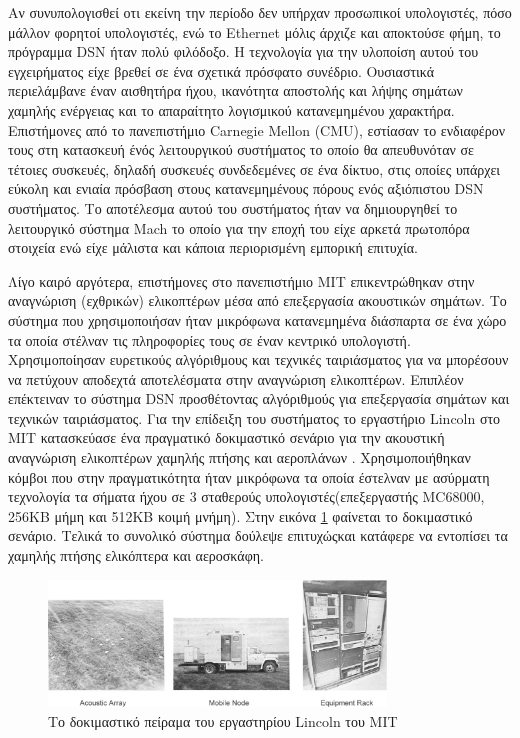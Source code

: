 Αν συνυπολογισθεί οτι εκείνη την περίοδο δεν υπήρχαν προσωπικοί υπολογιστές, πόσο μάλλον φορητοί υπολογιστές, ενώ το Ethernet μόλις άρχιζε και αποκτούσε φήμη, το
πρόγραμμα DSN ήταν πολύ φιλόδοξο.
Η τεχνολογία για την υλοποίση αυτού του εγχειρήματος είχε βρεθεί σε ένα σχετικά πρόσφατο συνέδριο\cite{1978DSN}.
Ουσιαστικά περιελάμβανε έναν αισθητήρα ήχου, ικανότητα αποστολής και λήψης σημάτων χαμηλής ενέργειας και το απαραίτητο λογισμικού κατανεμημένου χαρακτήρα.
Επιστήμονες από το πανεπιστήμιο Carnegie Mellon (CMU), εστίασαν το ενδιαφέρον τους στη κατασκευή ένός λειτουργικού συστήματος το οποίο θα απευθυνόταν σε τέτοιες
συσκευές, δηλαδή συσκευές συνδεδεμένες σε ένα δίκτυο, στις οποίες υπάρχει εύκολη και ενιαία πρόσβαση στους κατανεμημένους πόρους ενός αξιόπιστου DSN συστήματος.
Το αποτέλεσμα αυτού του συστήματος ήταν να δημιουργηθεί το λειτουργικό σύστημα Mach το οποίο για την εποχή του είχε αρκετά πρωτοπόρα στοιχεία \cite{Mach} ενώ είχε
μάλιστα και κάποια περιορισμένη εμπορική επιτυχία.

Λίγο καιρό αργότερα, επιστήμονες στο πανεπιστήμιο MIT επικεντρώθηκαν στην αναγνώριση (εχθρικών) ελικοπτέρων μέσα από επεξεργασία ακουστικών σημάτων.
Το σύστημα που χρησιμοποιήσαν ήταν μικρόφωνα κατανεμημένα διάσπαρτα σε ένα χώρο τα οποία στέλναν τις πληροφορίες τους σε έναν κεντρικό υπολογιστή.
Χρησιμοποίησαν ευρετικούς αλγόριθμους και τεχνικές ταιριάσματος για να μπορέσουν να πετύχουν αποδεχτά αποτελέσματα στην αναγνώριση ελικοπτέρων.
Επιπλέον επέκτειναν το σύστημα DSN προσθέτοντας αλγόριθμούς για επεξεργασία σημάτων και τεχνικών ταιριάσματος\cite{4789229}.
Για την επίδειξη του συστήματος το εργαστήριο Lincoln στο MIT κατασκεύασε ένα πραγματικό δοκιμαστικό σενάριο για την ακουστική αναγνώριση ελικοπτέρων χαμηλής πτήσης
και αεροπλάνων \cite{aircraft}.
Χρησιμοποιήθηκαν κόμβοι που στην πραγματικότητα ήταν μικρόφωνα τα οποία έστελναν με ασύρματη τεχνολογία τα σήματα ήχου σε 3 σταθερούς υπολογιστές(επεξεργαστής
MC68000, 256KB μήμη και 512ΚΒ κοιμή μνήμη).
Στην εικόνα \ref{fig:lincoln_lab}\cite{lincoln_report} φαίνεται το δοκιμαστικό σενάριο.
Τελικά το συνολικό σύστημα δούλεψε επιτυχώςκαι κατάφερε να εντοπίσει τα χαμηλής πτήσης ελικόπτερα και αεροσκάφη.
\begin{figure}
	\centering
	\includegraphics[width=0.8\textwidth]{images/lincoln_lab.eps}
	\caption{Tο δοκιμαστικό πείραμα του εργαστηρίου Lincoln του MIT}
	\label{fig:lincoln_lab}
\end{figure}

